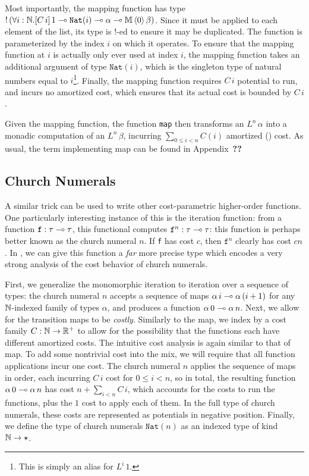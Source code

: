 Most importantly, the mapping function has type $!\left(\forall i : \mathbb{N}. [C \, i] \, 1 \multimap \texttt{Nat}(i) \multimap \alpha \multimap \mathbb{M} \, \langle 0 \rangle\,  \beta\right)$. Since it must be applied to each element of the list, its type is $!$-ed to ensure it may be duplicated. The function is parameterized by the index $i$ on which it operates. To ensure that the mapping function at $i$ is actually only ever used at index $i$, the mapping function takes an additional argument of type $\texttt{Nat}(i)$, which is the singleton type of natural numbers equal to $i$\footnote{
This is simply an alias for $L^i \, 1$.
}. Finally, the mapping function requires $C \, i$ potential to run, and incurs no amortized cost, which ensures that its actual cost is bounded by $C \, i$.

Given the mapping function, the function \texttt{map} then transforms an $L^n \, \alpha$ into a monadic computation of an $L^n \, \beta$, incurring $\sum_{0 \leq i < n} C(i)$ amortized () cost. As usual, the term implementing map can be found in Appendix~\textbf{??}


\subsection{Church Numerals}
A similar trick can be used to write other cost-parametric higher-order functions. One particularly interesting instance of this is the iteration function: from a  function $\texttt{f} : \tau \multimap \tau$, this functional computes $\texttt{f}^n : \tau \multimap \tau$: this function is perhaps better known as the church numeral $n$. If \texttt{f} has cost $c$, then $\texttt{f}^n$ clearly has cost $cn$. In \dlambdaamor, we can give this function a \textit{far} more precise type which encodes a very strong analysis of the cost behavior of church numerals.

First, we generalize the monomorphic iteration to iteration over a sequence of types: the  church numeral $n$ accepts a sequence of maps $\alpha \, i \multimap \alpha \, (i + 1)$ for any $\mathbb{N}$-indexed family of types $\alpha$, and produces a function $\alpha \, 0 \multimap \alpha \, n$. Next, we allow for the transition maps to be \textit{costly}. Similarly to the map, we index by a cost family $C : \mathbb{N} \to \mathbb{R}^+$ to allow for the possibility that the functions each have different amortized costs.  The intuitive cost analysis is again similar to that of map. To add some nontrivial cost into the mix, we will require that all function applications incur one cost. The church numeral $n$ applies the sequence of maps in order, each incurring $C \, i$ cost for $0 \leq i < n$, so in total, the resulting function $\alpha \, 0 \multimap \alpha \, n$ has cost $n + \sum_{i < n} C \, i$, which accounts for the costs to run the functions, plus the $1$ cost to apply each of them. In the full type of church numerals, these costs are represented as potentials in negative position. Finally, we define the type of church numerals $\texttt{Nat}(n)$  as an indexed type of kind $\mathbb{N} \to \star$.


